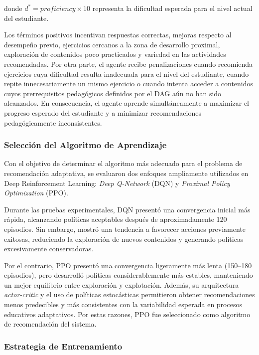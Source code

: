 donde $d^{*}=proficiency\times10$ representa la dificultad esperada para el nivel actual del estudiante.

Los términos positivos incentivan respuestas correctas, mejoras respecto al desempeño previo, ejercicios cercanos a la zona de desarrollo proximal, exploración de contenidos poco practicados y variedad en las actividades recomendadas. Por otra parte, el agente recibe penalizaciones cuando recomienda ejercicios cuya dificultad resulta inadecuada para el nivel del estudiante, cuando repite innecesariamente un mismo ejercicio o cuando intenta acceder a contenidos cuyos prerrequisitos pedagógicos definidos por el DAG aún no han sido alcanzados. En consecuencia, el agente aprende simultáneamente a maximizar el progreso esperado del estudiante y a minimizar recomendaciones pedagógicamente inconsistentes.

\subsubsection{Selección del Algoritmo de Aprendizaje}

Con el objetivo de determinar el algoritmo más adecuado para el problema de recomendación adaptativa, se evaluaron dos enfoques ampliamente utilizados en Deep Reinforcement Learning: \textit{Deep Q-Network} (DQN) y \textit{Proximal Policy Optimization} (PPO).

Durante las pruebas experimentales, DQN presentó una convergencia inicial más rápida, alcanzando políticas aceptables después de aproximadamente 120 episodios. Sin embargo, mostró una tendencia a favorecer acciones previamente exitosas, reduciendo la exploración de nuevos contenidos y generando políticas excesivamente conservadoras.

Por el contrario, PPO presentó una convergencia ligeramente más lenta (150--180 episodios), pero desarrolló políticas considerablemente más estables, manteniendo un mejor equilibrio entre exploración y explotación. Además, su arquitectura \textit{actor-critic} y el uso de políticas estocásticas permitieron obtener recomendaciones menos predecibles y más consistentes con la variabilidad esperada en procesos educativos adaptativos. Por estas razones, PPO fue seleccionado como algoritmo de recomendación del sistema.

\subsubsection{Estrategia de Entrenamiento}

